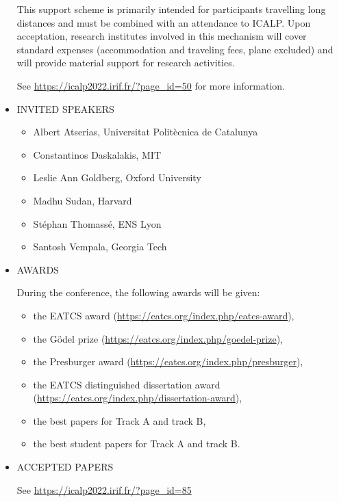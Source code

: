 \documentclass[prodmode,acmtecs]{acmsmall} %
\begin{document}
\begin{itemize}
  This support scheme is primarily intended for participants travelling long distances and must be combined with an attendance to ICALP. Upon acceptation, research institutes involved in this mechanism will cover standard expenses (accommodation and traveling fees, plane excluded) and will provide material support for research activities. 
 
  See \href{https://icalp2022.irif.fr/?page_id=50}{https://icalp2022.irif.fr/?page\_id=50} for more information. 
 
\item  INVITED SPEAKERS  
 
\begin{itemize}\item  Albert Atserias, Universitat Politècnica de Catalunya 
\item  Constantinos Daskalakis, MIT 
\item  Leslie Ann Goldberg, Oxford University
\item  Madhu Sudan, Harvard 
\item  Stéphan Thomassé, ENS Lyon 
\item  Santosh Vempala, Georgia Tech
\end{itemize} 
\item  AWARDS  
 
   During the conference, the following awards will be given: 
 
\begin{itemize}\item  the EATCS award (\href{https://eatcs.org/index.php/eatcs-award}{https://eatcs.org/index.php/eatcs-award}),
\item  the Gödel prize (\href{https://eatcs.org/index.php/goedel-prize}{https://eatcs.org/index.php/goedel-prize}),
\item  the Presburger award (\href{https://eatcs.org/index.php/presburger}{https://eatcs.org/index.php/presburger}),
\item  the EATCS distinguished dissertation award (\href{https://eatcs.org/index.php/dissertation-award}{https://eatcs.org/index.php/dissertation-award}),
\item  the best papers for Track A and track B,
\item  the best student papers for Track A and track B.
\end{itemize} 
\item  ACCEPTED PAPERS  
 
  See \href{https://icalp2022.irif.fr/?page_id=85}{https://icalp2022.irif.fr/?page\_id=85}  
 

\end{itemize}
\end{document}
